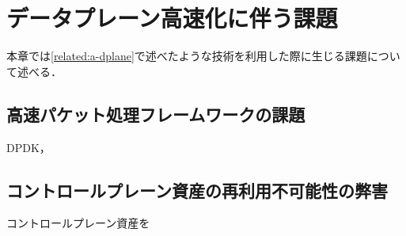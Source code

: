 \chapter{データプレーン高速化に伴う課題}
\label{issue}
本章では\ref{related:a-dplane}で述べたような技術を利用した際に生じる課題について述べる．
\section{高速パケット処理フレームワークの課題}
\label{issue:dplane}
DPDK，

\section{コントロールプレーン資産の再利用不可能性の弊害}
\label{issue:cplane}
コントロールプレーン資産を






